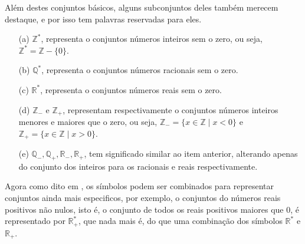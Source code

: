 Além destes conjuntos básicos, alguns subconjuntos deles também merecem destaque, e por isso tem palavras reservadas para eles.

\begin{itemize}
  \item[(a)] $\mathbb{Z}^*$, representa o conjuntos números inteiros sem o zero, ou seja, $\mathbb{Z}^* = \mathbb{Z} - \{0\}$.
  \item[(b)] $\mathbb{Q}^*$, representa o conjuntos números racionais sem o zero.
  \item[(c)] $\mathbb{R}^*$, representa o conjuntos números reais sem o zero.
  \item[(d)] $\mathbb{Z}_-$ e $\mathbb{Z}_+$, representam respectivamente o conjuntos números inteiros menores e maiores que o zero, ou seja, $\mathbb{Z}_- = \{x \in \mathbb{Z} \mid x < 0\}$ e $\mathbb{Z}_+ = \{x \in \mathbb{Z} \mid x > 0\}$.
  \item[(e)] $\mathbb{Q}_-, \mathbb{Q}_+, \mathbb{R}_-, \mathbb{R}_+$, tem significado similar ao item anterior, alterando apenas do conjunto dos inteiros para os racionais e reais respectivamente.
\end{itemize}

Agora como dito em \cite{carmo2013}, os símbolos podem ser combinados para representar conjuntos ainda mais especificos, por exemplo, o conjuntos do números reais positivos não nulos, isto é, o conjunto de todos os reais positivos maiores que $0$, é representado por $\mathbb{R}^*_+$, que nada mais é, do que uma combinação dos símbolos $\mathbb{R}^*$ e $\mathbb{R}_+$.





